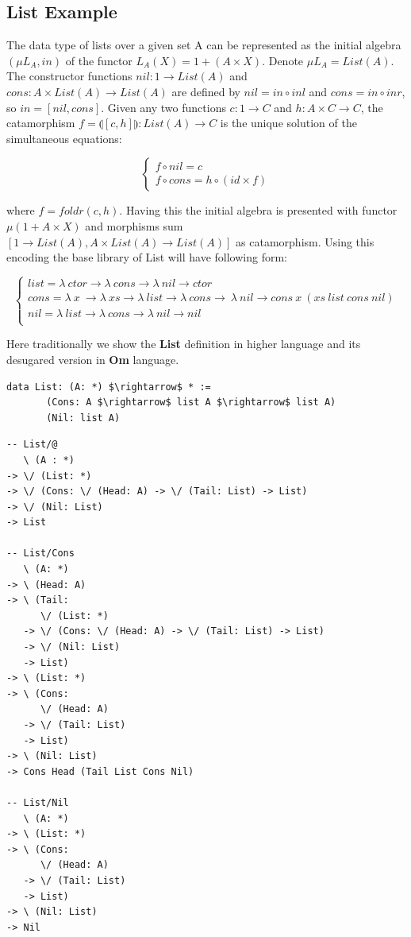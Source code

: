 \documentclass{aip-cp}
\begin{document}
\subsection{List Example}
The data type of lists over a given set A can be represented as the initial algebra
$(\mu L_A, in)$ of the functor $L_A(X) = 1 + (A \times X)$. Denote $\mu L_A = List(A)$.
The constructor functions $nil: 1 \rightarrow List(A)$ and
$cons: A \times List(A) \rightarrow List(A)$ are defined by
$nil = in \circ inl$ and $cons = in \circ inr$, so $in = [nil,cons]$.
Given any two functions $c: 1 \rightarrow C$ and $h: A \times C \rightarrow C$,
the catamorphism $f = \llparenthesis [c,h] \rrparenthesis : List(A) \rightarrow C$
is the unique solution of the simultaneous equations:

$$
\begin{cases}
  f \circ nil  = c \\
  f \circ cons = h \circ (id \times f)
\end{cases}
$$

where $f = foldr(c,h)$. Having this the initial algebra is presented with functor
$\mu (1 + A \times X)$ and morphisms sum $[1 \rightarrow List(A), A \times List(A) \rightarrow List(A)]$
as catamorphism. Using this encoding the base library of List will have following form:

$$
\begin{cases}
list = \lambda\ ctor \rightarrow \lambda\ cons \rightarrow \lambda\ nil \rightarrow ctor\\
cons = \lambda\ x\ \rightarrow \lambda\ xs \rightarrow \lambda\ list \rightarrow \lambda\ cons \rightarrow\ \lambda\ nil \rightarrow cons\ x\ (xs\ list\ cons\ nil)\\
nil = \lambda\ list \rightarrow \lambda\ cons \rightarrow \lambda\ nil \rightarrow nil\\
\end{cases}
$$

Here traditionally we show the {\bf List} definition in higher language and its
desugared version in {\bf Om} language.

\begin{lstlisting}[mathescape=true]
  data List: (A: *) $\rightarrow$ * :=
       (Cons: A $\rightarrow$ list A $\rightarrow$ list A)
       (Nil: list A)
\end{lstlisting}

\begin{lstlisting}[mathescape=true]
-- List/@
   \ (A : *)
-> \/ (List: *)
-> \/ (Cons: \/ (Head: A) -> \/ (Tail: List) -> List)
-> \/ (Nil: List)
-> List

-- List/Cons
   \ (A: *)
-> \ (Head: A)
-> \ (Tail:
      \/ (List: *)
   -> \/ (Cons: \/ (Head: A) -> \/ (Tail: List) -> List)
   -> \/ (Nil: List)
   -> List)
-> \ (List: *)
-> \ (Cons:
      \/ (Head: A)
   -> \/ (Tail: List)
   -> List)
-> \ (Nil: List)
-> Cons Head (Tail List Cons Nil)

-- List/Nil
   \ (A: *)
-> \ (List: *)
-> \ (Cons:
      \/ (Head: A)
   -> \/ (Tail: List)
   -> List)
-> \ (Nil: List)
-> Nil
\end{lstlisting}
\end{document}
